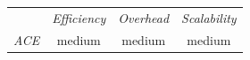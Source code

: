 \begin{center}
{\footnotesize
\begin{tabular}{rccc}
\multicolumn{1}{r}{} &
\multicolumn{1}{c}{\emph{Efficiency}} &
\multicolumn{1}{c}{\emph{Overhead}} &
\multicolumn{1}{c}{\emph{Scalability}}
\\
\cline{2-4}
\emph{ACE} &
medium &
medium &
medium
\end{tabular}
}
\end{center}



